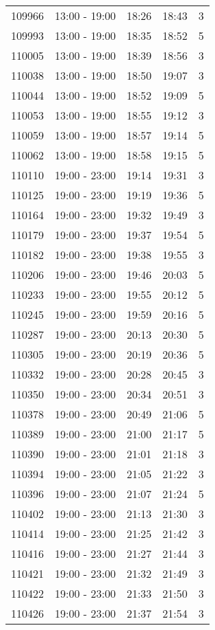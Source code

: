 \documentclass{article}
\begin{document}
\begin{tabular}{llccc}
109966 & 13:00 - 19:00 & 18:26 & 18:43 & 3 \\
109993 & 13:00 - 19:00 & 18:35 & 18:52 & 5 \\
110005 & 13:00 - 19:00 & 18:39 & 18:56 & 3 \\
110038 & 13:00 - 19:00 & 18:50 & 19:07 & 3 \\
110044 & 13:00 - 19:00 & 18:52 & 19:09 & 5 \\
110053 & 13:00 - 19:00 & 18:55 & 19:12 & 3 \\
110059 & 13:00 - 19:00 & 18:57 & 19:14 & 5 \\
110062 & 13:00 - 19:00 & 18:58 & 19:15 & 5 \\
110110 & 19:00 - 23:00 & 19:14 & 19:31 & 3 \\
110125 & 19:00 - 23:00 & 19:19 & 19:36 & 5 \\
110164 & 19:00 - 23:00 & 19:32 & 19:49 & 3 \\
110179 & 19:00 - 23:00 & 19:37 & 19:54 & 5 \\
110182 & 19:00 - 23:00 & 19:38 & 19:55 & 3 \\
110206 & 19:00 - 23:00 & 19:46 & 20:03 & 5 \\
110233 & 19:00 - 23:00 & 19:55 & 20:12 & 5 \\
110245 & 19:00 - 23:00 & 19:59 & 20:16 & 5 \\
110287 & 19:00 - 23:00 & 20:13 & 20:30 & 5 \\
110305 & 19:00 - 23:00 & 20:19 & 20:36 & 5 \\
110332 & 19:00 - 23:00 & 20:28 & 20:45 & 3 \\
110350 & 19:00 - 23:00 & 20:34 & 20:51 & 3 \\
110378 & 19:00 - 23:00 & 20:49 & 21:06 & 5 \\
110389 & 19:00 - 23:00 & 21:00 & 21:17 & 5 \\
110390 & 19:00 - 23:00 & 21:01 & 21:18 & 3 \\
110394 & 19:00 - 23:00 & 21:05 & 21:22 & 3 \\
110396 & 19:00 - 23:00 & 21:07 & 21:24 & 5 \\
110402 & 19:00 - 23:00 & 21:13 & 21:30 & 3 \\
110414 & 19:00 - 23:00 & 21:25 & 21:42 & 3 \\
110416 & 19:00 - 23:00 & 21:27 & 21:44 & 3 \\
110421 & 19:00 - 23:00 & 21:32 & 21:49 & 3 \\
110422 & 19:00 - 23:00 & 21:33 & 21:50 & 3 \\
110426 & 19:00 - 23:00 & 21:37 & 21:54 & 3 \\

\end{tabular}
\end{document}
